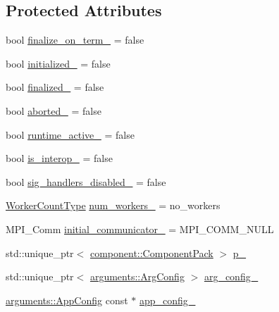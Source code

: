 \subsection*{Protected Attributes}
\begin{DoxyCompactItemize}
\item 
bool \hyperlink{structvt_1_1runtime_1_1_runtime_a1a7a0e6783b3326a4ded84f829a1d0b3}{finalize\+\_\+on\+\_\+term\+\_\+} = false
\item 
bool \hyperlink{structvt_1_1runtime_1_1_runtime_aaaad29e0591814b8f0632f2f85bd5e16}{initialized\+\_\+} = false
\item 
bool \hyperlink{structvt_1_1runtime_1_1_runtime_a2a798a2bf9b8c0a70785cde3cc8119c4}{finalized\+\_\+} = false
\item 
bool \hyperlink{structvt_1_1runtime_1_1_runtime_a19b9ad0859c6fb417b734ac1cc8be1a7}{aborted\+\_\+} = false
\item 
bool \hyperlink{structvt_1_1runtime_1_1_runtime_a0ab12b00f03032638dbc467d165bed30}{runtime\+\_\+active\+\_\+} = false
\item 
bool \hyperlink{structvt_1_1runtime_1_1_runtime_a1169e49a960d59b2e1c7d9f5f9ef838d}{is\+\_\+interop\+\_\+} = false
\item 
bool \hyperlink{structvt_1_1runtime_1_1_runtime_a09b053def0beaff3de9995e83b66170b}{sig\+\_\+handlers\+\_\+disabled\+\_\+} = false
\item 
\hyperlink{namespacevt_aa93398ea48f2cb6c188512250f7cc248}{Worker\+Count\+Type} \hyperlink{structvt_1_1runtime_1_1_runtime_ae0fc29c09650df6280cabeea1cb9e222}{num\+\_\+workers\+\_\+} = no\+\_\+workers
\item 
M\+P\+I\+\_\+\+Comm \hyperlink{structvt_1_1runtime_1_1_runtime_a13acc1db61dca9c5f9b3f389c074e521}{initial\+\_\+communicator\+\_\+} = M\+P\+I\+\_\+\+C\+O\+M\+M\+\_\+\+N\+U\+LL
\item 
std\+::unique\+\_\+ptr$<$ \hyperlink{structvt_1_1runtime_1_1component_1_1_component_pack}{component\+::\+Component\+Pack} $>$ \hyperlink{structvt_1_1runtime_1_1_runtime_a9f7ea8f6852d934e9c0122e074df0886}{p\+\_\+}
\item 
std\+::unique\+\_\+ptr$<$ \hyperlink{structvt_1_1arguments_1_1_arg_config}{arguments\+::\+Arg\+Config} $>$ \hyperlink{structvt_1_1runtime_1_1_runtime_a585321b816d6984bf7a9489d00bd3670}{arg\+\_\+config\+\_\+}
\item 
\hyperlink{structvt_1_1arguments_1_1_app_config}{arguments\+::\+App\+Config} const  $\ast$ \hyperlink{structvt_1_1runtime_1_1_runtime_a5fa2ceccc0e96fe0a97e0454e3a0a1ee}{app\+\_\+config\+\_\+}
\end{DoxyCompactItemize}
